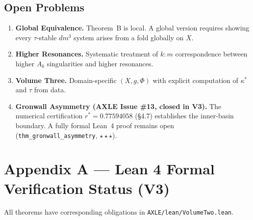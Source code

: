 \documentclass[11pt]{article}
\theoremstyle{boxed}
\begin{document}
\subsection{Open Problems}

\begin{enumerate}
  \item \textbf{Global Equivalence.} Theorem~B is local. A global version requires
        showing every $\tau$-stable $dm^3$ system arises from a fold globally on $X$.
  \item \textbf{Higher Resonances.} Systematic treatment of $k{:}m$ correspondence
        between higher $A_k$ singularities and higher resonances.
  \item \textbf{Volume Three.} Domain-specific $(X, g, \Phi)$ with explicit computation
        of $\kappa^{*}$ and $\tau$ from data.
  \item \textbf{Gronwall Asymmetry (AXLE Issue \#13, closed in V3).} The numerical
        certification $r^{*} = 0.77594058$ (\S 4.7) establishes the inner-basin
        boundary. A fully formal Lean~4 proof remains open
        (\texttt{thm\_gronwall\_asymmetry}, $\star\star\star$).
\end{enumerate}

\section*{Appendix A --- Lean 4 Formal Verification Status (V3)}

All theorems have corresponding obligations in \texttt{AXLE/lean/VolumeTwo.lean}.
\end{document}

